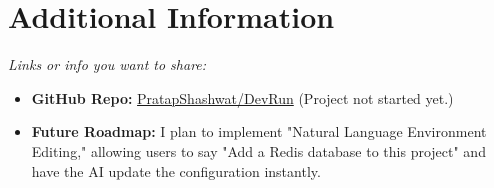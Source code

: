 \documentclass[a4paper,12pt]{article}
\begin{document}
\section{Additional Information}
\textit{Links or info you want to share:}
\begin{itemize}
    \item \textbf{GitHub Repo:} \href{https://github.com/PratapShashwat/DevRun}{PratapShashwat/DevRun}  (Project not started yet.) 
    \item \textbf{Future Roadmap:} I plan to implement "Natural Language Environment Editing," allowing users to say "Add a Redis database to this project" and have the AI update the configuration instantly.
\end{itemize}
\end{document}
